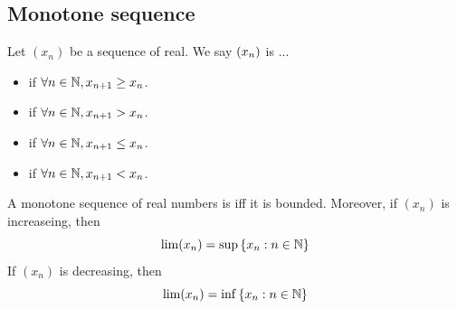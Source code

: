 \documentclass[a4paper,12pt]{article}
\begin{document}
\newpage
\subsection{Monotone sequence}

\begin{definition}
    Let \((x_n)\) be a sequence of real. We say \((x_{n})\) is ...
    \begin{itemize}
        \item {} if \(\forall n\in\mathbb{N}, x_{n+1}\ge x_n\).
        \item {} if \(\forall n\in\mathbb{N}, x_{n+1} > x_n\).
        \item {} if \(\forall n\in\mathbb{N}, x_{n+1}\le x_n\).
        \item {} if \(\forall n\in\mathbb{N}, x_{n+1}< x_n\).\\
    \end{itemize}
\end{definition}

\begin{theorem}
    A monotone sequence of real numbers is  iff it is bounded. 
Moreover, if \((x_n)\) is increaseing, then 
\[\lim(x_n) = \sup{\{x_n:n\in\mathbb{N}\}}\]
    If \((x_n)\) is decreasing, then 
    \[\lim(x_n) = \inf{\{x_n:n\in\mathbb{N}\}}\]
\end{theorem}
\end{document}
